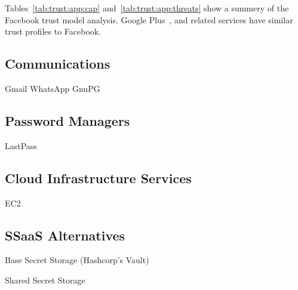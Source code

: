 Tables~\ref{tab:trust:app:cap} and~\ref{tab:trust:app:threats} show a
summery of the Facebook trust model analysis. Google
Plus~\cite{google-plus}, and related services have similar trust
profiles to Facebook.

\subsection{Communications}

Gmail
WhatsApp
GnuPG

\subsection{Password Managers}

LastPass

\subsection{Cloud Infrastructure Services}

EC2

\subsection{SSaaS Alternatives}

Base Secret Storage (Hashcorp's Vault)

Shared Secret Storage

